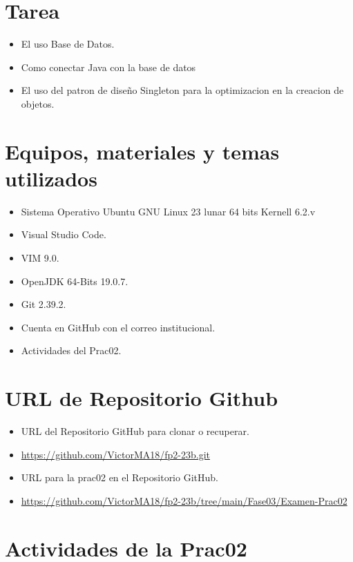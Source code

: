 \documentclass{article}
\begin{document}
	\section{Tarea}
	\begin{itemize}		
        \item El uso Base de Datos.
        \item Como conectar Java con la base de datos 
		\item El uso del patron de diseño Singleton para la optimizacion en la creacion de objetos.
	\end{itemize}

	\section{Equipos, materiales y temas utilizados}
	\begin{itemize}
		\item Sistema Operativo Ubuntu GNU Linux 23 lunar 64 bits Kernell 6.2.v
		\item Visual Studio Code.
		\item VIM 9.0.
		\item OpenJDK 64-Bits 19.0.7.
		\item Git 2.39.2.
		\item Cuenta en GitHub con el correo institucional.
		\item Actividades del Prac02.	
	\end{itemize}
	
	\section{URL de Repositorio Github}
	\begin{itemize}
		\item URL del Repositorio GitHub para clonar o recuperar.
		\item \url{https://github.com/VictorMA18/fp2-23b.git}
		\item URL para la prac02 en el Repositorio GitHub.
		\item \url{https://github.com/VictorMA18/fp2-23b/tree/main/Fase03/Examen-Prac02}
	\end{itemize}
	
	\section{Actividades de la Prac02}
\end{document}
